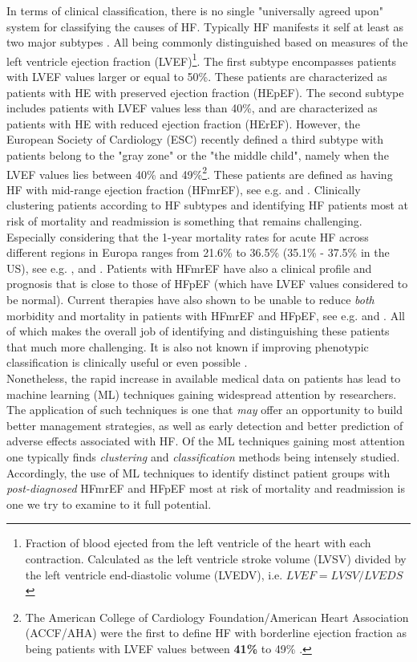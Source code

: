 \documentclass[../thesis.tex]{subfiles}
\begin{document}
\indent In terms of clinical classification, there is no single "universally agreed upon" system for classifying the causes of HF. Typically HF manifests it self at least as two major subtypes \citep{alonso2015exploring}. All being commonly distinguished based on measures of the left ventricle ejection fraction (LVEF)\footnote{Fraction of blood ejected from the left ventricle of the heart with each contraction. Calculated as the left ventricle stroke volume (LVSV) divided by the left ventricle end-diastolic volume (LVEDV), i.e. $LVEF = LVSV / LVEDS$ \citep{cikes2015beyond}}. The first subtype encompasses patients with LVEF values larger or equal to 50\%. These patients are characterized as patients with HE with preserved ejection fraction (HEpEF). The second subtype includes patients with LVEF values less than 40\%, and are characterized as patients with HE with reduced ejection fraction (HErEF). However, the European Society of Cardiology (ESC) recently defined a third subtype with patients belong to the "gray zone" or the "the middle child", namely when the LVEF values lies between 40\% and 49\%\footnote{The American College of Cardiology Foundation/American Heart Association (ACCF/AHA) were the first to define HF with borderline ejection fraction as being patients with LVEF values between \textbf{41\%} to 49\% \citep{yancy2013}.}. These patients are defined as having HF with mid-range ejection fraction (HFmrEF), see e.g. \cite{lam2014middle} and \cite{ponikowski2016}. Clinically clustering patients according to HF subtypes and identifying HF patients most at risk of mortality and readmission is something that remains challenging. Especially considering that the 1-year mortality rates for acute HF across different regions in Europa ranges from 21.6\% to 36.5\% (35.1\% - 37.5\% in the US), see e.g. \cite{cheng2014outcomes}, \cite{inamdar2016heart} and \cite{crespo2016european}. Patients with HFmrEF have also a clinical profile and prognosis that is close to those of HFpEF (which have LVEF values considered to be normal). Current therapies have also shown to be unable to reduce \textit{both} morbidity and mortality in patients with HFmrEF and HFpEF, see e.g. \cite{ponikowski2016} and \cite{hsu2017heart}. All of which makes the overall job of identifying and distinguishing these patients that much more challenging. It is also not known if improving phenotypic classification is clinically useful or even possible \citep{shah2014phenomapping}.\\
\indent Nonetheless, the rapid increase in available medical data on patients has lead to machine learning (ML) techniques gaining widespread attention by researchers. The application of such techniques is one that \textit{may} offer an opportunity to build better management strategies, as well as early detection and better prediction of adverse effects associated with HF. Of the ML techniques gaining most attention one typically finds \textit{clustering} and \textit{classification} methods being intensely studied. Accordingly, the use of ML techniques to identify distinct patient groups with \textit{post-diagnosed} HFmrEF and HFpEF most at risk of mortality and readmission is one we try to examine to it full potential.
\end{document}

